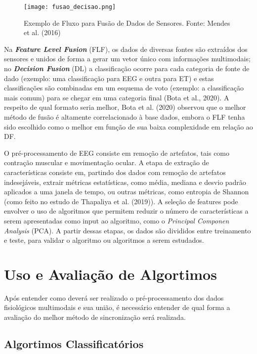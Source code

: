 \begin{figure}
      \centering
      \texttt{[image: fusao\_decisao.png]}
      \caption{Exemplo de Fluxo para Fusão de Dados de Sensores. Fonte:  Mendes et al. (2016)}
\end{figure}


Na \textit{\textbf{Feature Level Fusion}} (FLF), os dados de diversas fontes são extraídos dos sensores e unidos de forma a 
gerar um vetor único com informações multimodais; no \textit{\textbf{Decision Fusion}} (DL) a classificação ocorre para cada categoria 
de fonte de dado (exemplo: uma classificação para EEG e outra para ET) e estas 
classificações são combinadas em um esquema de voto (exemplo: a classificação mais comum) 
para se chegar em uma categoria final (Bota et al., 2020). A respeito de qual formato seria melhor, 
Bota et al. (2020) observou que o melhor método de fusão é altamente correlacionado à base dados, 
embora o FLF tenha sido escolhido como o melhor em função de sua baixa complexidade em relação ao DF. 


O pré-processamento de EEG consiste em remoção de artefatos, 
tais como contração muscular e movimentação ocular.
A etapa de extração de características consiste em, partindo dos dados com 
remoção de artefatos indesejáveis, extrair métricas estatísticas, como média, 
mediana e desvio padrão aplicados a uma janela de tempo, ou outras métricas, como entropia de Shannon 
(como feito no estudo de Thapaliya et al. (2019)). A seleção de features pode 
envolver o uso de algoritmos que permitem reduzir o número de características a 
serem apresentadas como input ao algoritmo, como o \textit{Principal Componen Analysis} (PCA).
 A partir dessas etapas, os dados são divididos entre treinamento e 
 teste, para validar o algoritmo ou algoritmos a serem estudados. 
 
\section{Uso e Avaliação de Algortimos}

Após entender como deverá ser realizado o pré-processamento dos dados fisiológicos multimodais e sua união, 
é necessário entender de qual forma a avaliação do melhor método de sincronização será realizada. 

\subsection{Algortimos Classificatórios}
% 

